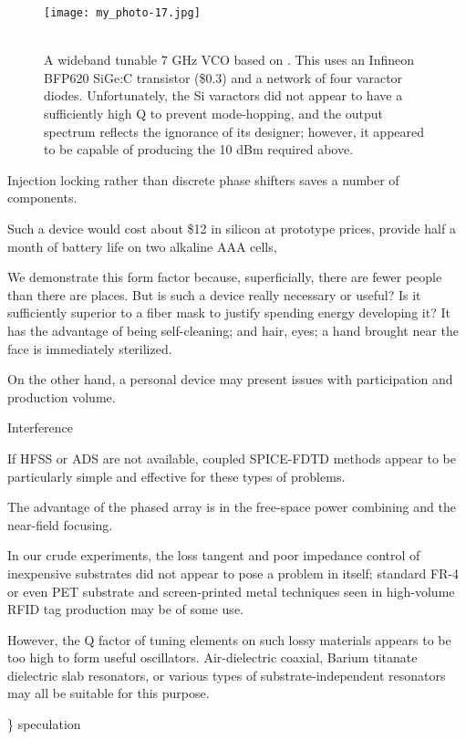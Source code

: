 \documentclass[paper.tex]{subfiles}
\begin{document}
\begin{figure}[H]
	\captionsetup{singlelinecheck = false, justification=justified}
	\centering
	\texttt{[image: my\_photo-17.jpg]}
	\caption{\\ A wideband tunable 7 GHz VCO based on \cite{TripleTuned2008}. This uses an Infineon BFP620 SiGe:C transistor (\$0.3) and a network of four varactor diodes. Unfortunately, the Si varactors did not appear to have a sufficiently high Q to prevent mode-hopping, and the output spectrum reflects the ignorance of its designer; however, it appeared to be capable of producing the 10 dBm required above.}
\end{figure}





Injection locking rather than discrete phase shifters saves a number of components.

Such a device would cost about \$12 in silicon at prototype prices, provide half a month of battery life on two alkaline AAA cells, 


We demonstrate this form factor because, superficially, there are fewer people than there are places. But is such a device really necessary or useful? Is it sufficiently superior to a fiber mask to justify spending energy developing it? It has the advantage of being self-cleaning; and hair, eyes; a hand brought near the face is immediately sterilized.


On the other hand, a personal device may present issues with participation and production volume. 

Interference

If HFSS or ADS are not available, coupled SPICE-FDTD methods appear to be particularly simple and effective for these types of problems.

The advantage of the phased array is in the free-space power combining and the near-field focusing.

In our crude experiments, the loss tangent and poor impedance control of inexpensive substrates did not appear to pose a problem in itself; standard FR-4 or even PET substrate and screen-printed metal techniques seen in high-volume RFID tag production may be of some use. 

However, the Q factor of tuning elements on such lossy materials appears to be too high to form useful oscillators. Air-dielectric coaxial, Barium titanate dielectric slab resonators, or various types of substrate-independent resonators may all be suitable for this purpose.

{\color{red} \} speculation } 
\end{document}
